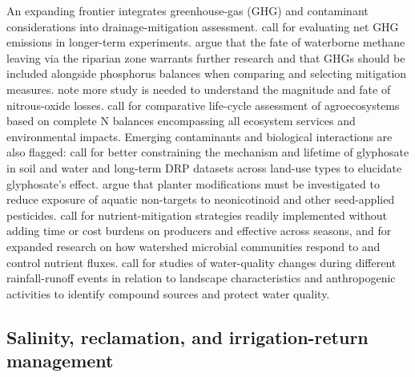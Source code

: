 An expanding frontier integrates greenhouse-gas (GHG) and contaminant considerations into drainage-mitigation assessment. \textcite{PrezaFontes2023} call for evaluating net GHG emissions in longer-term experiments. \textcite{Carstensen2021} argue that the fate of waterborne methane leaving via the riparian zone warrants further research and that GHGs should be included alongside phosphorus balances when comparing and selecting mitigation measures. \textcite{Burton2024} note more study is needed to understand the magnitude and fate of nitrous-oxide losses. \textcite{HernandezRamirez2011} call for comparative life-cycle assessment of agroecosystems based on complete N balances encompassing all ecosystem services and environmental impacts. Emerging contaminants and biological interactions are also flagged: \textcite{Spiese2023} call for better constraining the mechanism and lifetime of glyphosate in soil and water and long-term DRP datasets across land-use types to elucidate glyphosate's effect. \textcite{Schaafsma2019} argue that planter modifications must be investigated to reduce exposure of aquatic non-targets to neonicotinoid and other seed-applied pesticides. \textcite{Knorr2023} call for nutrient-mitigation strategies readily implemented without adding time or cost burdens on producers and effective across seasons, and for expanded research on how watershed microbial communities respond to and control nutrient fluxes. \textcite{Fraindová2022} call for studies of water-quality changes during different rainfall-runoff events in relation to landscape characteristics and anthropogenic activities to identify compound sources and protect water quality.

\subsection{Salinity, reclamation, and irrigation-return management}

